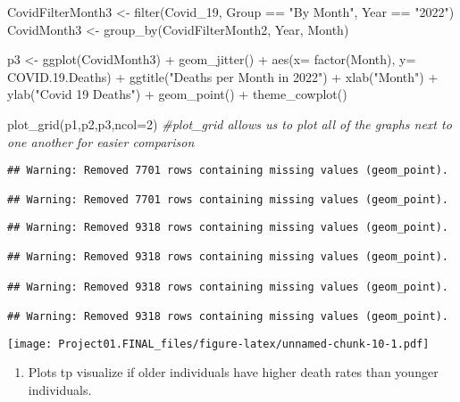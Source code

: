 \documentclass[
]{article}
\newenvironment{Shaded}{\begin{snugshade}}{\end{snugshade}}
\newcommand{\AttributeTok}[1]{\textcolor[rgb]{0.77,0.63,0.00}{#1}}
\newcommand{\CommentTok}[1]{\textcolor[rgb]{0.56,0.35,0.01}{\textit{#1}}}
\newcommand{\DecValTok}[1]{\textcolor[rgb]{0.00,0.00,0.81}{#1}}
\newcommand{\FloatTok}[1]{\textcolor[rgb]{0.00,0.00,0.81}{#1}}
\newcommand{\FunctionTok}[1]{\textcolor[rgb]{0.00,0.00,0.00}{#1}}
\newcommand{\NormalTok}[1]{#1}
\newcommand{\OtherTok}[1]{\textcolor[rgb]{0.56,0.35,0.01}{#1}}
\newcommand{\SpecialCharTok}[1]{\textcolor[rgb]{0.00,0.00,0.00}{#1}}
\newcommand{\StringTok}[1]{\textcolor[rgb]{0.31,0.60,0.02}{#1}}
\providecommand{\tightlist}{%
  \setlength{\itemsep}{0pt}\setlength{\parskip}{0pt}}
\begin{document}
\begin{Shaded}
\begin{Highlighting}[]
\NormalTok{CovidFilterMonth3 }\OtherTok{\textless{}{-}} \FunctionTok{filter}\NormalTok{(Covid\_19, Group }\SpecialCharTok{==} \StringTok{"By Month"}\NormalTok{, Year }\SpecialCharTok{==} \StringTok{"2022"}\NormalTok{)}
\NormalTok{CovidMonth3 }\OtherTok{\textless{}{-}} \FunctionTok{group\_by}\NormalTok{(CovidFilterMonth2, Year, Month)}

\NormalTok{p3 }\OtherTok{\textless{}{-}} \FunctionTok{ggplot}\NormalTok{(CovidMonth3) }\SpecialCharTok{+}
  \FunctionTok{geom\_jitter}\NormalTok{() }\SpecialCharTok{+} 
  \FunctionTok{aes}\NormalTok{(}\AttributeTok{x=} \FunctionTok{factor}\NormalTok{(Month), }\AttributeTok{y=}\NormalTok{ COVID.}\FloatTok{19.}\NormalTok{Deaths) }\SpecialCharTok{+} 
    \FunctionTok{ggtitle}\NormalTok{(}\StringTok{"Deaths per Month in 2022"}\NormalTok{) }\SpecialCharTok{+} 
  \FunctionTok{xlab}\NormalTok{(}\StringTok{"Month"}\NormalTok{) }\SpecialCharTok{+} 
  \FunctionTok{ylab}\NormalTok{(}\StringTok{"Covid 19 Deaths"}\NormalTok{) }\SpecialCharTok{+} 
  \FunctionTok{geom\_point}\NormalTok{() }\SpecialCharTok{+} 
  \FunctionTok{theme\_cowplot}\NormalTok{()}

\FunctionTok{plot\_grid}\NormalTok{(p1,p2,p3,}\AttributeTok{ncol=}\DecValTok{2}\NormalTok{) }\CommentTok{\#plot\_grid allows us to plot all of the graphs next to one another for easier comparison}
\end{Highlighting}
\end{Shaded}

\begin{verbatim}
## Warning: Removed 7701 rows containing missing values (geom_point).

## Warning: Removed 7701 rows containing missing values (geom_point).
\end{verbatim}

\begin{verbatim}
## Warning: Removed 9318 rows containing missing values (geom_point).

## Warning: Removed 9318 rows containing missing values (geom_point).

## Warning: Removed 9318 rows containing missing values (geom_point).

## Warning: Removed 9318 rows containing missing values (geom_point).
\end{verbatim}

\texttt{[image: Project01.FINAL\_files/figure-latex/unnamed-chunk-10-1.pdf]}

\begin{enumerate}
\def\labelenumi{\arabic{enumi}.}
\setcounter{enumi}{1}
\tightlist
\item
  Plots tp visualize if older individuals have higher death rates than
  younger individuals.
\end{enumerate}
\end{document}
